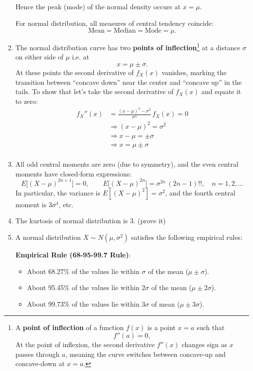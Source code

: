 \documentclass[twoside]{book}
\begin{document}
\begin{enumerate}
  Hence the peak (mode) of the normal density occurs at \(x=\mu\).  
  \begin{textbox}
  For normal distribution, all measures of central tendency coincide:
      \[
        \text{Mean} = \text{Median} = \text{Mode} = \mu.
      \]
  \end{textbox}
    
    
  \item The normal distribution curve has two \textbf{points of inflection}\footnote{A \textbf{point of inflection} of a function $f(x)$ is a point $x = a$ such that
  \[
  f''(a) = 0,
  \]
  At the point of inflexion, the second derivative $f''(x)$ changes sign as $x$ passes through $a$, meaning the curve switches between concave‐up and concave‐down at $x = a$.} at a distance $\sigma$ on either side of $\mu$ i.e. at
    \[
      x = \mu \pm \sigma.
    \]
    At these points the second derivative of \(f_X(x)\) vanishes, marking the transition between “concave down” near the center and “concave up” in the tails. To show that let's take the second derivative of $f_X(x)$ and equate it to zero:
   \begin{align*}
   f_X''(x) &= \frac{(x-\mu)^2 - \sigma^2}{\sigma^4}\,f_X(x) = 0 \\
   &\Rightarrow (x-\mu)^2 = \sigma^2 \\
   &\Rightarrow x-\mu = \pm\sigma \\
   &\Rightarrow x = \mu \pm\sigma \\
   \end{align*}
    
  \item All odd central moments are zero (due to symmetry), and the even central moments have closed‐form expressions:
    \[
      E\bigl[(X-\mu)^{2n+1}\bigr] = 0,
      \qquad
      E\bigl[(X-\mu)^{2n}\bigr] = \sigma^{2n}\,(2n - 1)!!,
      \quad n = 1,2,\dots
    \]
    In particular, the variance is \(E[(X-\mu)^2]=\sigma^2\), and the fourth central moment is \(3\sigma^4\), etc.
    
   \item The kurtosis of normal distribution is 3. (prove it)
    
  \item A normal distribution \(X\sim N(\mu,\sigma^2)\) satisfies the following empirical rules:

  \begin{textbox}
  \textbf{Empirical Rule (68-95-99.7 Rule)}:
    \begin{itemize}
        \item About 68.27\% of the values lie within $\sigma$ of the mean ($\mu \pm \sigma$).
        \item About 95.45\% of the values lie within $2\sigma$ of the mean ($\mu \pm 2\sigma$).
        \item About 99.73\% of the values lie within $3\sigma$ of mean ($\mu \pm 3\sigma$).
    \end{itemize}
  \end{textbox}
  

\end{enumerate}
\end{document}
